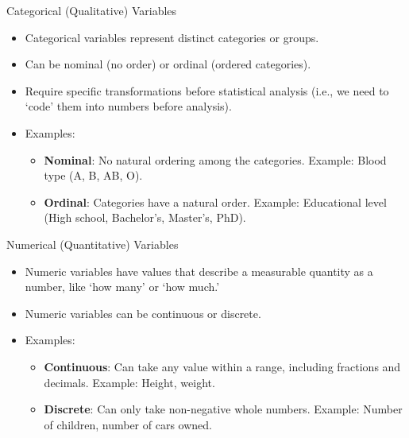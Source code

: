 \documentclass[handout]{beamer} %
\begin{document}
\begin{frame}{Categorical (Qualitative) Variables}
    \begin{itemize}
        \item Categorical variables represent distinct categories or groups.
        \item Can be nominal (no order) or ordinal (ordered categories).
        \item Require specific transformations before statistical analysis (i.e., we need to `code' them into numbers before analysis).
        \item Examples:
        \begin{itemize}
        \item \textbf{Nominal}: No natural ordering among the categories. Example: Blood type (A, B, AB, O).
        \item \textbf{Ordinal}: Categories have a natural order. Example: Educational level (High school, Bachelor’s, Master’s, PhD).
    \end{itemize}
    \end{itemize}

\end{frame}

\begin{frame}{Numerical (Quantitative) Variables}
    \begin{itemize}
        \item Numeric variables have values that describe a measurable quantity as a number, like  `how many' or `how much.'
        \item Numeric variables can be continuous or discrete.
        \item Examples:
        \begin{itemize}
        \item \textbf{Continuous}: Can take any value within a range, including fractions and decimals. Example: Height, weight.
        \item \textbf{Discrete}: Can only take non-negative whole numbers. Example: Number of children, number of cars owned.
    \end{itemize}
    \end{itemize}
\end{frame}
\end{document}

